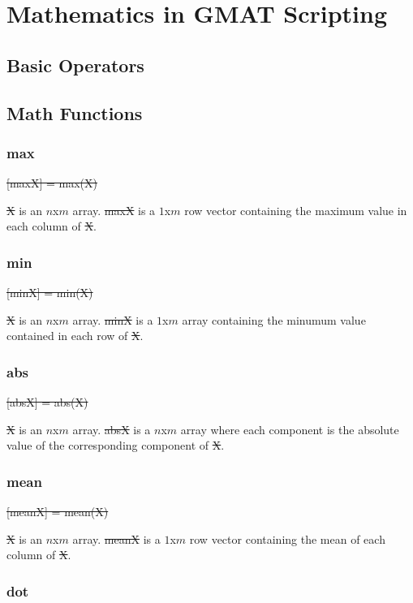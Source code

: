 \chapter{Mathematics in GMAT Scripting} \label{Ch:MathInScript} 

\section{Basic Operators}

\section{Math Functions}

\subsection{max}

\st{ [maxX] = max(X) }

\st{X} is an $n$x$m$ array.  \st{maxX} is a $1$x$m$ row vector
containing the maximum value in each column of \st{X}.

\subsection{min}

\st{ [minX] = min(X) }

\st{X} is an $n$x$m$ array.  \st{minX} is a $1$x$m$ array containing
the minumum value contained in each row of \st{X}.

\subsection{abs}

\st{ [absX] = abs(X) }

\st{X} is an $n$x$m$ array.  \st{absX} is a $n$x$m$ array where each
component is the absolute value of the corresponding component of
\st{X}.

\subsection{mean}

\st{ [meanX] = mean(X) }

\st{X} is an $n$x$m$ array.  \st{meanX} is a $1$x$m$ row vector
containing the mean of each column of \st{X}.

\subsection{dot}

